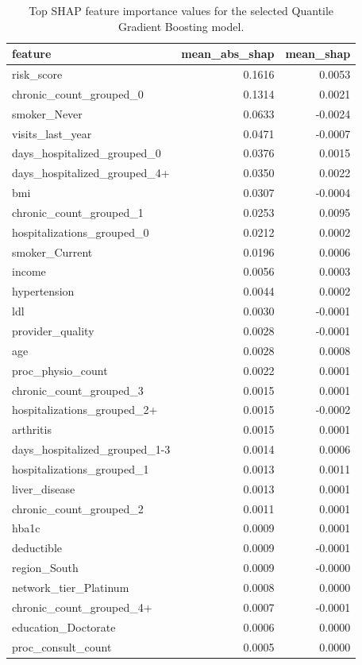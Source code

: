 \begin{table}
\caption{Top SHAP feature importance values for the selected Quantile Gradient Boosting model.}
\label{tab:06-selected-tail-shap-importance}
\begin{tabular}{lrr}
\toprule
feature & mean_abs_shap & mean_shap \\
\midrule
risk_score & 0.1616 & 0.0053 \\
chronic_count_grouped_0 & 0.1314 & 0.0021 \\
smoker_Never & 0.0633 & -0.0024 \\
visits_last_year & 0.0471 & -0.0007 \\
days_hospitalized_grouped_0 & 0.0376 & 0.0015 \\
days_hospitalized_grouped_4+ & 0.0350 & 0.0022 \\
bmi & 0.0307 & -0.0004 \\
chronic_count_grouped_1 & 0.0253 & 0.0095 \\
hospitalizations_grouped_0 & 0.0212 & 0.0002 \\
smoker_Current & 0.0196 & 0.0006 \\
income & 0.0056 & 0.0003 \\
hypertension & 0.0044 & 0.0002 \\
ldl & 0.0030 & -0.0001 \\
provider_quality & 0.0028 & -0.0001 \\
age & 0.0028 & 0.0008 \\
proc_physio_count & 0.0022 & 0.0001 \\
chronic_count_grouped_3 & 0.0015 & 0.0001 \\
hospitalizations_grouped_2+ & 0.0015 & -0.0002 \\
arthritis & 0.0015 & 0.0001 \\
days_hospitalized_grouped_1-3 & 0.0014 & 0.0006 \\
hospitalizations_grouped_1 & 0.0013 & 0.0011 \\
liver_disease & 0.0013 & 0.0001 \\
chronic_count_grouped_2 & 0.0011 & 0.0001 \\
hba1c & 0.0009 & 0.0001 \\
deductible & 0.0009 & -0.0001 \\
region_South & 0.0009 & -0.0000 \\
network_tier_Platinum & 0.0008 & 0.0000 \\
chronic_count_grouped_4+ & 0.0007 & -0.0001 \\
education_Doctorate & 0.0006 & 0.0000 \\
proc_consult_count & 0.0005 & 0.0000 \\
\bottomrule
\end{tabular}
\end{table}
